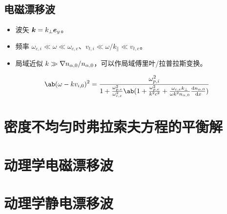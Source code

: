 \subsection{电磁漂移波}

\begin{itemize}
    \item 波矢 $\bm{k} = k_\perp \bm{e}_y$。
    \item 频率 $\omega_{c,i} \ll \omega \ll \omega_{c,e}$、$v_{t,i} \ll \omega / k_\parallel \ll v_{t,e}$。
    \item 局域近似 $k \gg \nabla {n_{\alpha,0}}/n_{\alpha,0}$，可以作局域傅里叶/拉普拉斯变换。
\end{itemize}

\begin{equation}
\ab(\omega - k v_{i,0})^2 = \frac{\omega_{p,i}^2}{
    1 + \frac{\omega_{p,e}^2}{\omega_{c,e}^2} \ab(
    1 + \frac{\omega_{p,e}^2}{k^2 c^2}
    + \frac{\omega_{c,e} k_\perp}{\omega k^2 n_{\alpha,0}} \odv{n_{\alpha,0}}{x}
)}
\end{equation}

\section{密度不均匀时弗拉索夫方程的平衡解}

\section{动理学电磁漂移波}

\section{动理学静电漂移波}
